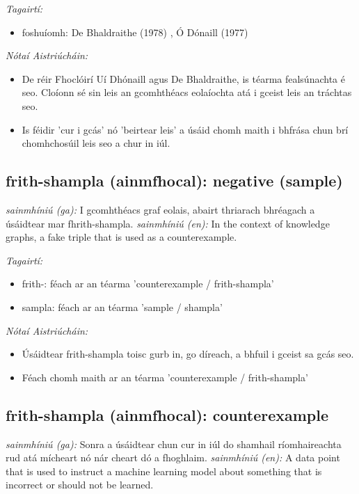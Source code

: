 \documentclass{article}
\begin{document}
 \noindent \textit{Tagairtí:}
\begin{itemize}
	\item foshuíomh: De Bhaldraithe (1978) \cite{de-bhaldraithe}, Ó Dónaill (1977) \cite{odonaill}
\end{itemize}

 \noindent \textit{Nótaí Aistriúcháin:}
\begin{itemize}
	\item De réir Fhoclóirí Uí Dhónaill agus De Bhaldraithe, is téarma fealsúnachta é seo. Cloíonn sé sin leis an gcomhthéacs eolaíochta atá i gceist leis an tráchtas seo.
	\item Is féidir 'cur i gcás' nó 'beirtear leis' a úsáid chomh maith i bhfrása chun brí chomhchosúil leis seo a chur in iúl.
\end{itemize}


\subsection*{frith-shampla (ainmfhocal): negative (sample)} 
 \noindent \textit{sainmhíniú (ga):} I gcomhthéacs graf eolais, abairt thriarach bhréagach a úsáidtear mar fhrith-shampla.
\newline\newline
 \noindent \textit{sainmhíniú (en):} In the context of knowledge graphs, a fake triple that is used as a counterexample.
\newline

 \noindent \textit{Tagairtí:}
\begin{itemize}
	\item frith-: féach ar an téarma 'counterexample / frith-shampla'
	\item sampla: féach ar an téarma 'sample / shampla'
\end{itemize}

 \noindent \textit{Nótaí Aistriúcháin:}
\begin{itemize}
	\item Úsáidtear frith-shampla toisc gurb in, go díreach, a bhfuil i gceist sa gcás seo.
	\item Féach chomh maith ar an téarma 'counterexample / frith-shampla'
\end{itemize}


\subsection*{frith-shampla (ainmfhocal): counterexample} 
 \noindent \textit{sainmhíniú (ga):} Sonra a úsáidtear chun cur in iúl do shamhail ríomhaireachta rud atá mícheart nó nár cheart dó a fhoghlaim.
\newline\newline
 \noindent \textit{sainmhíniú (en):} A data point that is used to instruct a machine learning model about something that is incorrect or should not be learned.
\newline
\end{document}
